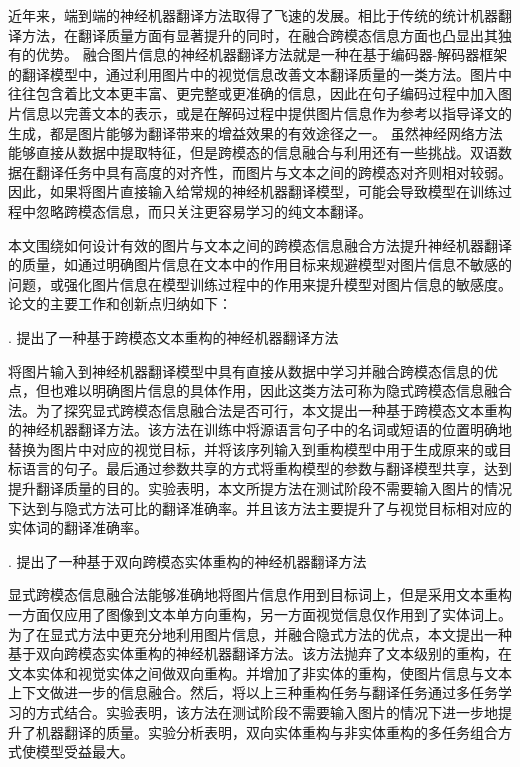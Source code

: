 近年来，端到端的神经机器翻译方法取得了飞速的发展。相比于传统的统计机器翻译方法，在翻译质量方面有显著提升的同时，在融合跨模态信息方面也凸显出其独有的优势。
融合图片信息的神经机器翻译方法就是一种在基于编码器-解码器框架的翻译模型中，通过利用图片中的视觉信息改善文本翻译质量的一类方法。图片中往往包含着比文本更丰富、更完整或更准确的信息，因此在句子编码过程中加入图片信息以完善文本的表示，或是在解码过程中提供图片信息作为参考以指导译文的生成，都是图片能够为翻译带来的增益效果的有效途径之一。
虽然神经网络方法能够直接从数据中提取特征，但是跨模态的信息融合与利用还有一些挑战。双语数据在翻译任务中具有高度的对齐性，而图片与文本之间的跨模态对齐则相对较弱。因此，如果将图片直接输入给常规的神经机器翻译模型，可能会导致模型在训练过程中忽略跨模态信息，而只关注更容易学习的纯文本翻译。

本文围绕如何设计有效的图片与文本之间的跨模态信息融合方法提升神经机器翻译的质量，如通过明确图片信息在文本中的作用目标来规避模型对图片信息不敏感的问题，或强化图片信息在模型训练过程中的作用来提升模型对图片信息的敏感度。论文的主要工作和创新点归纳如下：

{. 提出了一种基于跨模态文本重构的神经机器翻译方法}

将图片输入到神经机器翻译模型中具有直接从数据中学习并融合跨模态信息的优点，但也难以明确图片信息的具体作用，因此这类方法可称为隐式跨模态信息融合法。为了探究显式跨模态信息融合法是否可行，本文提出一种基于跨模态文本重构的神经机器翻译方法。该方法在训练中将源语言句子中的名词或短语的位置明确地替换为图片中对应的视觉目标，并将该序列输入到重构模型中用于生成原来的或目标语言的句子。最后通过参数共享的方式将重构模型的参数与翻译模型共享，达到提升翻译质量的目的。实验表明，本文所提方法在测试阶段不需要输入图片的情况下达到与隐式方法可比的翻译准确率。并且该方法主要提升了与视觉目标相对应的实体词的翻译准确率。

{. 提出了一种基于双向跨模态实体重构的神经机器翻译方法}

显式跨模态信息融合法能够准确地将图片信息作用到目标词上，但是采用文本重构一方面仅应用了图像到文本单方向重构，另一方面视觉信息仅作用到了实体词上。为了在显式方法中更充分地利用图片信息，并融合隐式方法的优点，本文提出一种基于双向跨模态实体重构的神经机器翻译方法。该方法抛弃了文本级别的重构，在文本实体和视觉实体之间做双向重构。并增加了非实体的重构，使图片信息与文本上下文做进一步的信息融合。然后，将以上三种重构任务与翻译任务通过多任务学习的方式结合。实验表明，该方法在测试阶段不需要输入图片的情况下进一步地提升了机器翻译的质量。实验分析表明，双向实体重构与非实体重构的多任务组合方式使模型受益最大。

